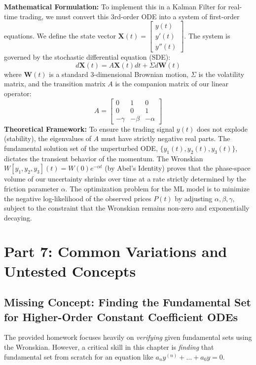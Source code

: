 \documentclass[11pt,letterpaper]{article}
\begin{document}
\textbf{Mathematical Formulation:}
To implement this in a Kalman Filter for real-time trading, we must convert this 3rd-order ODE into a system of first-order equations. We define the state vector $\mathbf{X}(t) = \begin{bmatrix} y(t) \\ y'(t) \\ y''(t) \end{bmatrix}$.
The system is governed by the stochastic differential equation (SDE):
\[ d\mathbf{X}(t) = A \mathbf{X}(t) dt + \Sigma d\mathbf{W}(t) \]
where $\mathbf{W}(t)$ is a standard 3-dimensional Brownian motion, $\Sigma$ is the volatility matrix, and the transition matrix $A$ is the companion matrix of our linear operator:
\[ A = \begin{bmatrix} 0 & 1 & 0 \\ 0 & 0 & 1 \\ -\gamma & -\beta & -\alpha \end{bmatrix} \]
\textbf{Theoretical Framework:}
To ensure the trading signal $y(t)$ does not explode (stability), the eigenvalues of $A$ must have strictly negative real parts. The fundamental solution set of the unperturbed ODE, $\{y_1(t), y_2(t), y_3(t)\}$, dictates the transient behavior of the momentum. The Wronskian $W[y_1, y_2, y_3](t) = W(0)e^{-\alpha t}$ (by Abel's Identity) proves that the phase-space volume of our uncertainty shrinks over time at a rate strictly determined by the friction parameter $\alpha$. The optimization problem for the ML model is to minimize the negative log-likelihood of the observed prices $P(t)$ by adjusting $\alpha, \beta, \gamma$, subject to the constraint that the Wronskian remains non-zero and exponentially decaying.

\newpage
\section{Part 7: Common Variations and Untested Concepts}

\subsection{Missing Concept: Finding the Fundamental Set for Higher-Order Constant Coefficient ODEs}
The provided homework focuses heavily on \textit{verifying} given fundamental sets using the Wronskian. However, a critical skill in this chapter is \textit{finding} that fundamental set from scratch for an equation like $a_n y^{(n)} + \dots + a_0 y = 0$.
\end{document}
